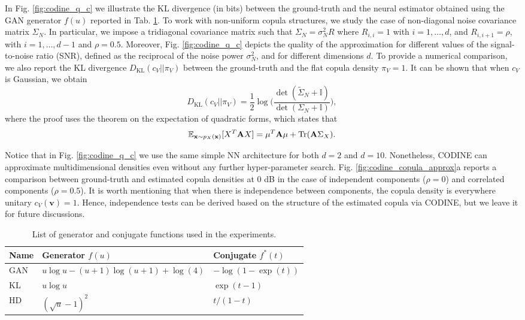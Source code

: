 In Fig. \ref{fig:codine_q_c} we illustrate the KL divergence (in bits) between the ground-truth and the neural estimator obtained using the GAN generator $f(u)$ reported in Tab. \ref{tab:codine_generators}. To work with non-uniform copula structures, we study the case of non-diagonal noise covariance matrix $\Sigma_N$. In particular, we impose a tridiagonal covariance matrix such that $\Sigma_N=\sigma_N^2 R$ where $R_{i,i} = 1$ with $i=1,\dots,d$, and $R_{i,i+1}=\rho$, with $i=1,\dots,d-1$ and $\rho=0.5$. Moreover, Fig. \ref{fig:codine_q_c} depicts the quality of the approximation for different values of the signal-to-noise ratio (SNR), defined as the reciprocal of the noise power $\sigma_N^2$, and for different dimensions $d$. To provide a numerical comparison, we also report the KL divergence $D_{\text{KL}}(c_{V}||\pi_{V})$ between the ground-truth and the flat copula density $\pi_V = 1$. It can be shown that when $c_V$ is Gaussian, we obtain
\begin{equation}
D_{\text{KL}}(c_{V}||\pi_{V}) = \frac{1}{2}\log\biggl(\frac{\det(\tilde{\Sigma}_N+\mathbb{I})}{\det(\Sigma_N+\mathbb{I})}\biggr),
\end{equation}
where the proof uses the theorem on the expectation of quadratic forms, which states that
\begin{equation}
    \mathbb{E}_{\mathbf{x} \sim p_X(\mathbf{x})}[X^T\mathbf{A}X] = \mu^T\mathbf{A}\mu + \operatorname{Tr}(\mathbf{A}\Sigma_X).
\end{equation}

Notice that in Fig. \ref{fig:codine_q_c} we use the same simple NN architecture for both $d=2$ and $d=10$. Nonetheless, CODINE can approximate multidimensional densities even without any further hyper-parameter search. 
Fig. \ref{fig:codine_copula_approx}a reports a comparison between ground-truth and estimated copula densities at $0$ dB in the case of independent components ($\rho=0$) and correlated components ($\rho=0.5$). It is worth mentioning that when there is independence between components, the copula density is everywhere unitary $c_V(\mathbf{v})$$=$$1$. Hence, independence tests can be derived based on the structure of the estimated copula via CODINE, but we leave it for future discussions.


\begin{table}[t!]
\centering
\begin{tabular}{l|l|l}
Name & Generator $f(u)$                   & Conjugate $f^*(t)$  \\ \hline
GAN  & $u\log u -(u+1)\log (u+1)+\log(4)$ & $-\log (1-\exp(t))$ \\ \hline
KL   & $u\log u$                          & $\exp(t-1)$         \\ \hline
HD   & $(\sqrt{u}-1)^2$                   & $t/(1-t)$     \\ \hline
\end{tabular}
\caption{List of generator and conjugate functions used in the experiments.}
\label{tab:codine_generators}
\end{table} 

